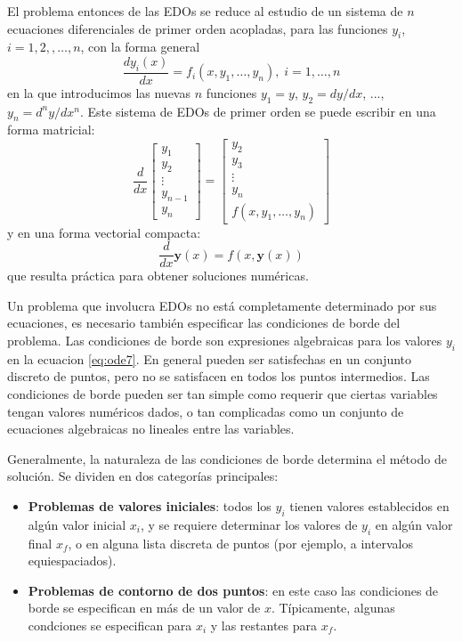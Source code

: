 El problema entonces de las EDOs se reduce al estudio de un sistema de $n$ ecuaciones diferenciales de primer orden acopladas, para las funciones $y_i$, $i = 1, 2, ,\ldots, n$, con la forma general
\begin{equation} \label{eq:ode7}
 \frac{dy_i(x)}{dx} = f_i(x, y_1, \ldots, y_n), \; i = 1,\ldots,n
\end{equation} 
en la que introducimos las nuevas $n$ funciones $y_1 = y$, $y_2 = dy/dx$, ..., $y_n = d^ny/dx^n$. Este sistema de EDOs de primer orden se puede escribir en una forma matricial:
\begin{equation} \label{eq:matricial}
 \frac{d}{dx}
 \begin{bmatrix}
  y_1 \\
  y_2 \\
  \vdots \\
  y_{n-1} \\
  y_n
 \end{bmatrix} =
 \begin{bmatrix}
  y_2 \\
  y_3 \\
  \vdots \\
  y_n \\
  f(x, y_1, \ldots, y_n)
 \end{bmatrix}
\end{equation} 
y en una forma vectorial compacta:
\begin{equation}\label{eq:estandar}
 \frac{d}{dx} \bm{y}(x) = f(x, \bm{y}(x))
\end{equation} 
que resulta práctica para obtener soluciones numéricas.

Un problema que involucra EDOs no está completamente determinado por sus ecuaciones, es necesario también especificar las condiciones de borde del problema. Las condiciones de borde son expresiones algebraicas para los valores $y_i$ en la ecuacion \ref{eq:ode7}. En general pueden ser satisfechas en un conjunto discreto de puntos, pero no se satisfacen en todos los puntos intermedios. Las condiciones de borde pueden ser tan simple como requerir que ciertas variables tengan valores numéricos dados, o tan complicadas como un conjunto de ecuaciones algebraicas no lineales entre las variables.

Generalmente, la naturaleza de las condiciones de borde determina el método de solución. Se dividen en dos categorías principales:
\begin{itemize}
 \item \textbf{Problemas de valores iniciales}: todos los $y_i$ tienen valores establecidos en algún valor inicial $x_i$, y se requiere determinar los valores de $y_i$ en algún valor final $x_f$, o en alguna lista discreta de puntos (por ejemplo, a intervalos equiespaciados).
 \item  \textbf{Problemas de contorno de dos puntos}: en este caso las condiciones de borde se especifican en más de un valor de $x$. Típicamente, algunas condciones se especifican para $x_i$ y las restantes para $x_f$.
\end{itemize}

